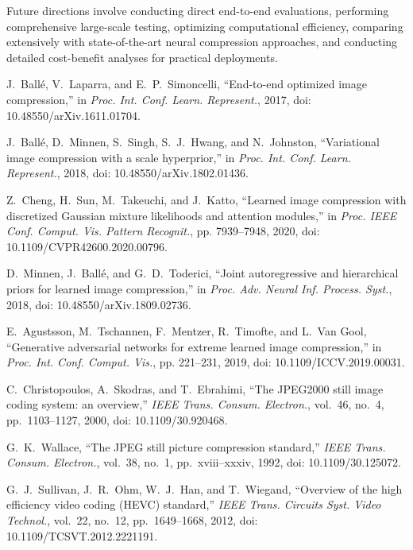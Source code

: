 \documentclass[conference]{IEEEtran}
\begin{document}
Future directions involve conducting direct end-to-end evaluations, performing comprehensive large-scale testing, optimizing computational efficiency, comparing extensively with state-of-the-art neural compression approaches, and conducting detailed cost-benefit analyses for practical deployments.
\begin{thebibliography}{00}

J.~Ballé, V.~Laparra, and E.~P.~Simoncelli, ``End-to-end optimized image compression,'' in \textit{Proc. Int. Conf. Learn. Represent.}, 2017, doi: 10.48550/arXiv.1611.01704.

J.~Ballé, D.~Minnen, S.~Singh, S.~J.~Hwang, and N.~Johnston, ``Variational image compression with a scale hyperprior,'' in \textit{Proc. Int. Conf. Learn. Represent.}, 2018, doi: 10.48550/arXiv.1802.01436.

Z.~Cheng, H.~Sun, M.~Takeuchi, and J.~Katto, ``Learned image compression with discretized Gaussian mixture likelihoods and attention modules,'' in \textit{Proc. IEEE Conf. Comput. Vis. Pattern Recognit.}, pp. 7939--7948, 2020, doi: 10.1109/CVPR42600.2020.00796.

D.~Minnen, J.~Ballé, and G.~D.~Toderici, ``Joint autoregressive and hierarchical priors for learned image compression,'' in \textit{Proc. Adv. Neural Inf. Process. Syst.}, 2018, doi: 10.48550/arXiv.1809.02736.

E.~Agustsson, M.~Tschannen, F.~Mentzer, R.~Timofte, and L.~Van Gool, ``Generative adversarial networks for extreme learned image compression,'' in \textit{Proc. Int. Conf. Comput. Vis.}, pp. 221--231, 2019, doi: 10.1109/ICCV.2019.00031.

C.~Christopoulos, A.~Skodras, and T.~Ebrahimi, ``The JPEG2000 still image coding system: an overview,'' \textit{IEEE Trans. Consum. Electron.}, vol.~46, no.~4, pp.~1103--1127, 2000, doi: 10.1109/30.920468.

G.~K.~Wallace, ``The JPEG still picture compression standard,'' \textit{IEEE Trans. Consum. Electron.}, vol.~38, no.~1, pp.~xviii--xxxiv, 1992, doi: 10.1109/30.125072.

G.~J.~Sullivan, J.~R.~Ohm, W.~J.~Han, and T.~Wiegand, ``Overview of the high efficiency video coding (HEVC) standard,'' \textit{IEEE Trans. Circuits Syst. Video Technol.}, vol.~22, no.~12, pp.~1649--1668, 2012, doi: 10.1109/TCSVT.2012.2221191.


\end{thebibliography}
\end{document}
